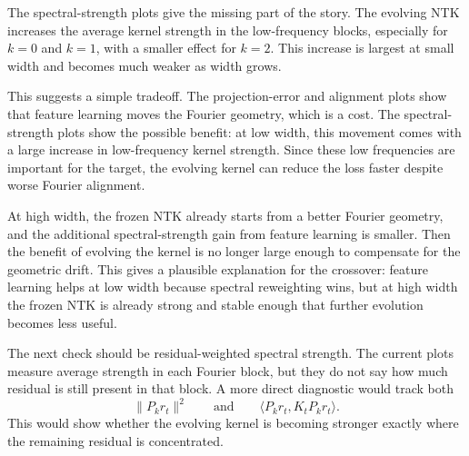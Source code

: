 \documentclass[11pt]{article}
\begin{document}
The spectral-strength plots give the missing part of the story. The evolving
NTK increases the average kernel strength in the low-frequency blocks, especially
for \(k=0\) and \(k=1\), with a smaller effect for \(k=2\). This increase is
largest at small width and becomes much weaker as width grows.

This suggests a simple tradeoff. The projection-error and alignment plots show
that feature learning moves the Fourier geometry, which is a cost. The
spectral-strength plots show the possible benefit: at low width, this movement
comes with a large increase in low-frequency kernel strength. Since these low
frequencies are important for the target, the evolving kernel can reduce the loss
faster despite worse Fourier alignment.

At high width, the frozen NTK already starts from a better Fourier geometry, and
the additional spectral-strength gain from feature learning is smaller. Then the
benefit of evolving the kernel is no longer large enough to compensate for the
geometric drift. This gives a plausible explanation for the crossover: feature
learning helps at low width because spectral reweighting wins, but at high width
the frozen NTK is already strong and stable enough that further evolution becomes
less useful.

The next check should be residual-weighted spectral strength. The current plots
measure average strength in each Fourier block, but they do not say how much
residual is still present in that block. A more direct diagnostic would track
both
\[
	\|P_k r_t\|^2
	\qquad\text{and}\qquad
	\langle P_k r_t, K_t P_k r_t\rangle .
\]
This would show whether the evolving kernel is becoming stronger exactly where
the remaining residual is concentrated.
\end{document}
